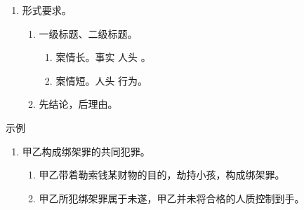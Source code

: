 \begin{enumerate}
\begin{enumerate}
\begin{enumerate}
                  \item 罪数。。
                  \item 数额。问到才答。
                  \item 量刑。主要考自首、立功等量刑制度，不考具体建议。。
                  \item 具体法条。不需要。
                  \item 罪名。认为应当构成 A 罪时，才考虑是否回答不构成 B 罪。。
                  \item {}。！！
                        \begin{enumerate}
                          \item {}。
                          \item {}。
                          \item {}。
                        \end{enumerate}
                \end{enumerate}
          \item 形式要求。
                \begin{enumerate}
                  \item 一级标题、二级标题。
                        \begin{enumerate}
                          \item 案情长。事实 \yjt 人头 \yjt {}。
                          \item 案情短。人头 \yjt 行为。
                        \end{enumerate}
                  \item 先结论，后理由。
                \end{enumerate}
        \end{enumerate}
        \begin{kk}{示例}
          \begin{enumerate}
            \item 甲乙构成绑架罪的共同犯罪。
                  \begin{enumerate}
                    \item 甲乙带着勒索钱某财物的目的，劫持小孩，构成绑架罪。
                    \item 甲乙所犯绑架罪属于未遂，甲乙并未将合格的人质控制到手。

\end{enumerate}
\end{enumerate}
\end{kk}
\end{enumerate}
